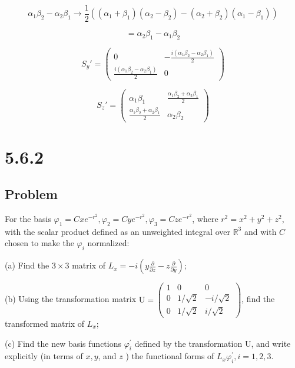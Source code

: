 \documentclass[12pt]{article}
\begin{document}
\[
    \alpha_1\beta_2 - \alpha_2\beta_1 \rightarrow
    \frac{1}{2}\left((\alpha_1 + \beta_1)(\alpha_2 - \beta_2) - (\alpha_2 + \beta_2)(\alpha_1 - \beta_1)\right)
\]

\[
    = \alpha_2\beta_1 - \alpha_1\beta_2
\]

\[
    {S_y}' =
    \begin{pmatrix}
        0                                              & -\frac{i(\alpha_1\beta_2 - \alpha_2\beta_1)}{2} \\
        \frac{i(\alpha_1\beta_2 - \alpha_2\beta_1)}{2} & 0
    \end{pmatrix}
\]

\[
    {S_z}' =
    \begin{pmatrix}
        \alpha_1\beta_1                             & \frac{\alpha_1\beta_2 + \alpha_2\beta_1}{2} \\
        \frac{\alpha_1\beta_2 + \alpha_2\beta_1}{2} & \alpha_2\beta_2
    \end{pmatrix}
\]

\newpage
\section{5.6.2}

\subsection{Problem}

For the basis \(\varphi_1=C x e^{-r^2}, \varphi_2=C y e^{-r^2}, \varphi_3=C z e^{-r^2}\), where \(r^2=x^2+y^2+z^2\), with the scalar product defined as an unweighted integral over \(\mathbb{R}^3\) and with \(C\) chosen to make the \(\varphi_i\) normalized:

(a) Find the \(3 \times 3\) matrix of \(L_x=-i\left(y \frac{\partial}{\partial z}-z \frac{\partial}{\partial y}\right)\);

(b) Using the transformation matrix \(\mathrm{U}=\left(\begin{array}{ccc}1 & 0 & 0 \\ 0 & 1 / \sqrt{2} & -i / \sqrt{2} \\ 0 & 1 / \sqrt{2} & i / \sqrt{2}\end{array}\right)\), find the transformed matrix of \(L_x\);

(c) Find the new basis functions \(\varphi_i^{\prime}\) defined by the transformation \(\mathrm{U}\), and write explicitly (in terms of \(x, y\), and \(z\) ) the functional forms of \(L_x \varphi_i^{\prime}, i=1,2,3\).
\end{document}
